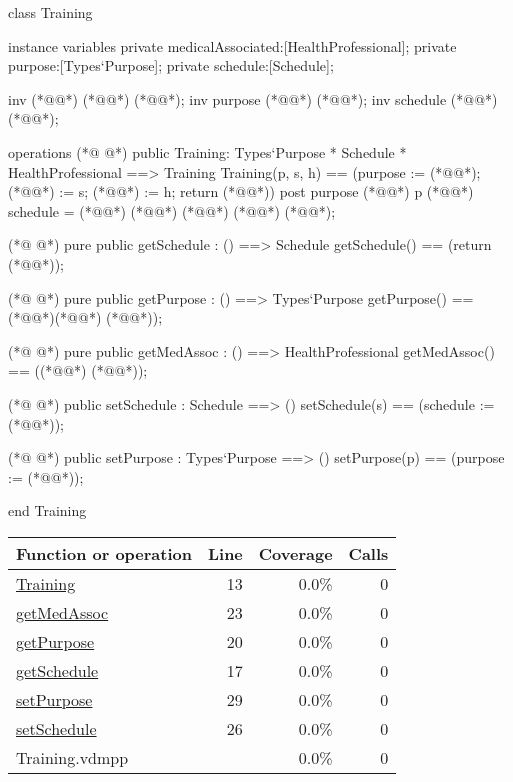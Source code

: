 \begin{vdmpp}[breaklines=true]
class Training
 
instance variables
 private medicalAssociated:[HealthProfessional];
 private purpose:[Types`Purpose];
 private schedule:[Schedule];

 inv (*@@*) (*@\vdmnotcovered{<>}@*) (*@@*);
 inv purpose (*@\vdmnotcovered{<>}@*) (*@@*);
 inv schedule (*@\vdmnotcovered{<>}@*) (*@@*);

operations
(*@
\label{Training:13}
@*)
 public Training: Types`Purpose * Schedule * HealthProfessional ==> Training
   Training(p, s, h) == (purpose := (*@@*); (*@@*) := s; (*@@*) := h; return (*@@*))
 post purpose (*@\vdmnotcovered{=}@*) p (*@@*) schedule = (*@@*) (*@@*) (*@@*) (*@\vdmnotcovered{=}@*) (*@@*);

(*@
\label{getSchedule:17}
@*)
 pure public getSchedule : () ==> Schedule
   getSchedule() == (return (*@@*));
 
(*@
\label{getPurpose:20}
@*)
  pure public getPurpose : () ==> Types`Purpose
  getPurpose() == (*@\vdmnotcovered{(}@*)(*@@*) (*@@*)); 
 
(*@
\label{getMedAssoc:23}
@*)
 pure public getMedAssoc : () ==> HealthProfessional
  getMedAssoc() == ((*@@*) (*@@*)); 

(*@
\label{setSchedule:26}
@*)
 public setSchedule : Schedule ==> ()
   setSchedule(s) == (schedule := (*@@*));
 
(*@
\label{setPurpose:29}
@*)
 public setPurpose : Types`Purpose ==> ()
   setPurpose(p) == (purpose := (*@@*));
 
 end Training
\end{vdmpp}
\bigskip
\begin{longtable}{|l|r|r|r|}
\hline
Function or operation & Line & Coverage & Calls \\
\hline
\hline
\hyperref[Training:13]{Training} & 13&0.0\% & 0 \\
\hline
\hyperref[getMedAssoc:23]{getMedAssoc} & 23&0.0\% & 0 \\
\hline
\hyperref[getPurpose:20]{getPurpose} & 20&0.0\% & 0 \\
\hline
\hyperref[getSchedule:17]{getSchedule} & 17&0.0\% & 0 \\
\hline
\hyperref[setPurpose:29]{setPurpose} & 29&0.0\% & 0 \\
\hline
\hyperref[setSchedule:26]{setSchedule} & 26&0.0\% & 0 \\
\hline
\hline
Training.vdmpp & & 0.0\% & 0 \\
\hline
\end{longtable}

